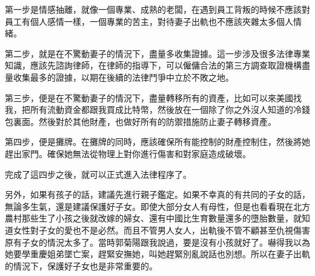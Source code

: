 第一步是情感抽離，就像一個專業、成熟的老闆，在遇到員工背叛的時候不應該對員工有個人感情一樣，一個專業的苦主，對待妻子出軌也不應該夾雜太多個人情緒。

第二步，就是在不驚動妻子的情況下，盡量多收集證據。這一步涉及很多法律專業知識，應該先諮詢律師，在律師的指導下，可以僱傭合法的第三方調查取證機構盡量收集最多的證據，以期在後續的法律鬥爭中立於不敗之地。

第三步，便是在不驚動妻子的情況下，盡量轉移所有的資產，比如可以來美國找我，把所有流動資金都跟我買成比特幣，然後放在一個除了你之外沒人知道的冷錢包裏面。然後對於其他財產，也做好所有的防禦措施防止妻子轉移資產。

第四步，便是攤牌。在攤牌的同時，應該確保所有能控制的財產控制住，然後將她趕出家門。確保她無法從物理上對你進行傷害和對家庭造成破壞。

完成了這四步之後，就可以正式進入法律程序了。

另外，如果有孩子的話，建議先進行親子鑑定。如果不幸真的有共同的子女的話，無論多生氣，還是建議保護好子女。即使大部分女人有母性，但是也看看現在北方農村那些生了小孩之後就改嫁的婦女、還有中國比生育數量還多的墮胎數量，就知道女性對子女的愛也不是必然。而且不管男人女人，出軌後不管不顧甚至仇視傷害原有子女的情況太多了。當時郭菊陽跟我說過，要是沒有小孩就好了。嚇得我以為她要學重慶姐弟墜亡案，趕緊安撫她，叫她趕緊別亂說話也別想。所以在妻子出軌的情況下，保護好子女也是非常重要的。
